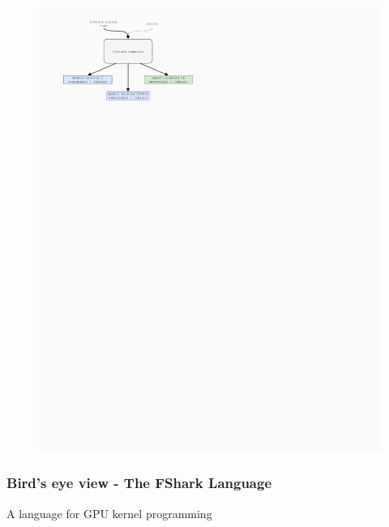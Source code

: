 \documentclass[10pt, compress]{beamer}
\begin{document}
\begin{frame}[fragile]
\begin{figure}
\begin{overprint}
        \includegraphics{./images/futhark_diagram_after.pdf}
      \end{overprint}
    \end{figure}

\end{frame}

\begin{frame}[plain,c]
  \frametitle{Bird's eye view - The FShark Language}
  \begin{center}
    \Huge A language for GPU kernel programming
  \end{center}
\end{frame}
\end{document}
